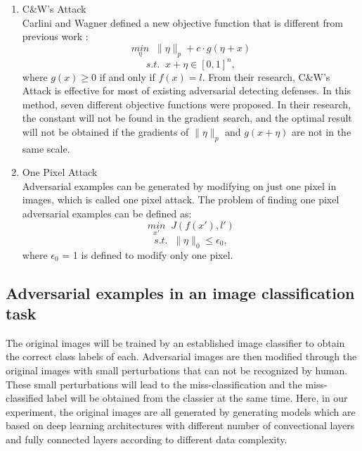 \documentclass{article}
\begin{document}
\begin{enumerate}
\item C&W’s Attack \\
Carlini and Wagner defined a new objective function  that is different from previous work \cite{Carlini_and_Wagner}\cite{Magnet}: $$\underset{\eta}{min}\;\; \|\eta\|_p+c \cdot g(\eta + x) $$
$$s.t.\;\; x+ \eta \in[0,1]^n,$$
where $g(x) \ge 0$ if and only if $f(x)=l$. From their research\cite{Carlini_and_Wagner}\cite{Magnet}, C\&W’s Attack is effective for most of existing adversarial detecting defenses. In this method, seven different objective functions were proposed.
In their research, the constant  will not be found in the gradient search, and the optimal result will not be obtained if the gradients of $\| \eta \| _p$ and $g(x + \eta)$ are not in the same scale.
\item One Pixel Attack \\
Adversarial examples can be generated by modifying on just one pixel in images, which is called one pixel attack\cite{Su}. The problem of finding one pixel adversarial examples can be defined as:
$$\underset{x'}{min} \;\; J(f(x'),l')$$
$$s.t. \;\; \|\eta\|_0 \leq \epsilon_0, $$
where $\epsilon_0$ = 1 is defined to modify only one pixel.
\end{enumerate}
\subsection{Adversarial examples in an image classification task}
The original images will be trained by an established image classifier to obtain the correct class labels of each. Adversarial images are then modified through the original images with small perturbations that can not be recognized by human. These small perturbations will lead to the miss-classification and the miss-classified label will be obtained from the classier at the same time.
Here, in our experiment, the original images are all generated by generating models which are based on deep learning architectures with different number of convectional layers and fully connected layers according to different data complexity.



\end{document}
